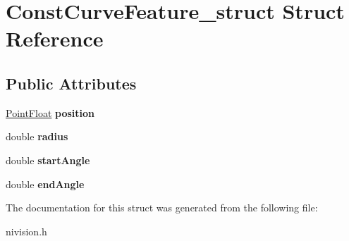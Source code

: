 \hypertarget{structConstCurveFeature__struct}{
\section{ConstCurveFeature\_\-struct Struct Reference}
\label{structConstCurveFeature__struct}
}
\subsection*{Public Attributes}
\begin{DoxyCompactItemize}
\item 
\hypertarget{structConstCurveFeature__struct_a78138aa92ee34f814c02c7ed732a8c4a}{
\hyperlink{structPointFloat__struct}{PointFloat} {\bfseries position}}
\label{structConstCurveFeature__struct_a78138aa92ee34f814c02c7ed732a8c4a}

\item 
\hypertarget{structConstCurveFeature__struct_afde7bb7b3de40daa79168a6b4f25da07}{
double {\bfseries radius}}
\label{structConstCurveFeature__struct_afde7bb7b3de40daa79168a6b4f25da07}

\item 
\hypertarget{structConstCurveFeature__struct_a28b49bf0346faf524c6e900c1fbab853}{
double {\bfseries startAngle}}
\label{structConstCurveFeature__struct_a28b49bf0346faf524c6e900c1fbab853}

\item 
\hypertarget{structConstCurveFeature__struct_a886fa0c7ca20766d5a3870b56874afe4}{
double {\bfseries endAngle}}
\label{structConstCurveFeature__struct_a886fa0c7ca20766d5a3870b56874afe4}

\end{DoxyCompactItemize}


The documentation for this struct was generated from the following file:\begin{DoxyCompactItemize}
\item 
nivision.h\end{DoxyCompactItemize}
